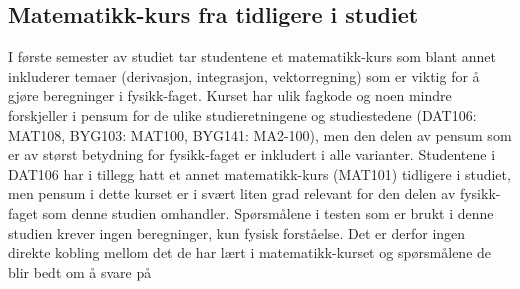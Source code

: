 \documentclass[a4paper,norsk,12pt]{report}
\begin{document}
\subsection{Matematikk-kurs fra tidligere i studiet}
I første semester av studiet tar studentene et matematikk-kurs som blant annet inkluderer temaer (derivasjon, integrasjon, vektorregning) som er viktig for å gjøre beregninger i fysikk-faget. Kurset har ulik fagkode og noen mindre forskjeller i pensum for de ulike studieretningene og studiestedene (DAT106: MAT108, BYG103: MAT100, BYG141: MA2-100), men den delen av pensum som er av størst betydning for fysikk-faget er inkludert i alle varianter. Studentene i DAT106 har i tillegg hatt et annet matematikk-kurs (MAT101) tidligere i studiet, men pensum i dette kurset er i svært liten grad relevant for den delen av fysikk-faget som denne studien omhandler. Spørsmålene i testen som er brukt i denne studien krever ingen beregninger, kun fysisk forståelse. Det er derfor ingen direkte kobling mellom det de har lært i matematikk-kurset og spørsmålene de blir bedt om å svare på




\end{document}
